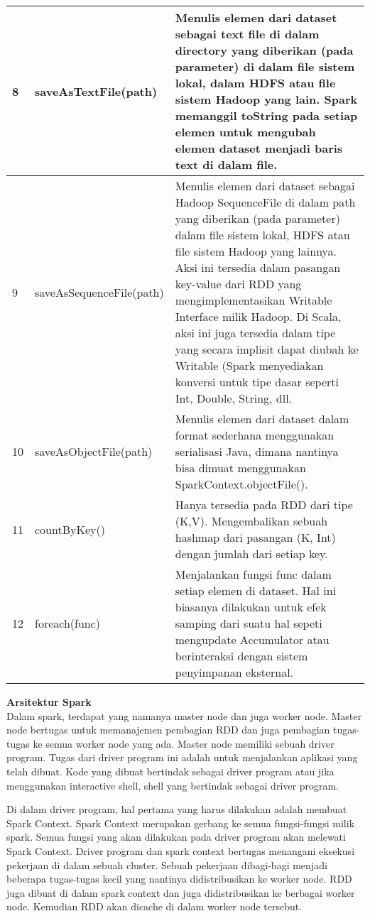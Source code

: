 \documentclass[a4paper,twoside]{article}
\begin{document}
\begin{enumerate}
\begin{tabular}{|p{}|p{}|p{}|}
\hline 
8 & saveAsTextFile(path) & Menulis elemen dari dataset sebagai text file di dalam directory yang diberikan (pada parameter) di dalam file sistem lokal, dalam HDFS atau file sistem Hadoop yang lain. Spark memanggil toString pada setiap elemen untuk mengubah elemen dataset menjadi baris text di dalam file. \\ 
\hline 
9 & saveAsSequenceFile(path) & Menulis elemen dari dataset sebagai Hadoop SequenceFile di dalam path yang diberikan (pada parameter) dalam file sistem lokal, HDFS atau file sistem Hadoop yang lainnya. Aksi ini tersedia dalam pasangan key-value dari RDD yang mengimplementasikan Writable Interface milik Hadoop. Di Scala, aksi ini juga tersedia dalam tipe yang secara implisit dapat diubah ke Writable (Spark menyediakan konversi untuk tipe dasar seperti Int, Double, String, dll. \\ 
\hline 
10 & saveAsObjectFile(path) & Menulis elemen dari dataset dalam format sederhana menggunakan serialisasi Java, dimana nantinya bisa dimuat menggunakan SparkContext.objectFile().\\ 
\hline 
11 & countByKey() & Hanya tersedia pada RDD dari tipe (K,V). Mengembalikan sebuah hashmap dari pasangan (K, Int) dengan jumlah dari setiap key.\\ 
\hline 
12 & foreach(func) & Menjalankan fungsi func dalam setiap elemen di dataset. Hal ini biasanya dilakukan untuk efek samping dari suatu hal sepeti mengupdate Accumulator atau berinteraksi dengan sistem penyimpanan eksternal.\\ 
\hline 
\end{tabular} 

\textbf{Arsitektur Spark}\\
Dalam spark, terdapat yang namanya master node dan juga worker node. Master node bertugas untuk memanajemen pembagian RDD dan juga pembagian tugas-tugas ke semua worker node yang ada. Master node memiliki sebuah driver program. Tugas dari driver program ini adalah untuk menjalankan aplikasi yang telah dibuat. Kode yang dibuat bertindak sebagai driver program atau jika menggunakan interactive shell, shell yang bertindak sebagai driver program.

Di dalam driver program, hal pertama yang harus dilakukan adalah membuat Spark Context. Spark Context merupakan gerbang ke semua fungsi-fungsi milik spark. Semua fungsi yang akan dilakukan pada driver program akan melewati Spark Context. Driver program dan spark context bertugas menangani eksekusi pekerjaan di dalam sebuah cluster. Sebuah pekerjaan dibagi-bagi menjadi beberapa tugas-tugas kecil yang nantinya didistribusikan ke worker node. RDD juga dibuat di dalam spark context dan juga didistribusikan ke berbagai worker node. Kemudian RDD akan dicache di dalam worker node tersebut.


\end{enumerate}
\end{document}
